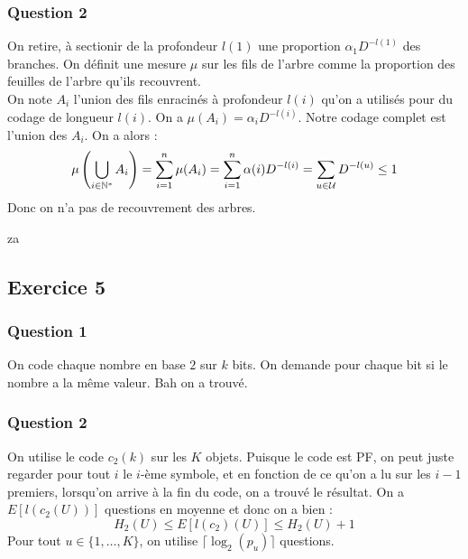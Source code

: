 \documentclass{cours}
\begin{document}
\subsubsection{Question 2}
On retire, à sectionir de la profondeur $l(1)$ une proportion $\alpha_{1}D^{-l(1)}$ des branches. On définit une mesure $\mu$ sur les fils de l'arbre comme la proportion des feuilles de l'arbre qu'ils recouvrent. \\
On note $A_{i}$ l'union des fils enracinés à profondeur $l(i)$ qu'on a utilisés pour du codage de longueur $l(i)$. On a $\mu(A_{i}) = \alpha_{i}D^{-l(i)}$. Notre codage complet est l'union des $A_{i}$. On a alors : 
\[
    \mu\left(\bigcup_{i \in \mathbb{N}^{*}} A_{i}\right) = \sum_{i = 1}^{n} \mu(A_{i}) = \sum_{i = 1}^{n}\alpha(i)D^{-l(i)} = \sum_{u \in \mathcal{U}} D^{-l(u)} \leq 1
\]
Donc on n'a pas de recouvrement des arbres. 

za
\subsection{Exercice 5}
\subsubsection{Question 1}
On code chaque nombre en base $2$ sur $k$ bits. On demande pour chaque bit si le nombre a la même valeur. Bah on a trouvé.

\subsubsection{Question 2}
On utilise le code $c_{2}(k)$ sur les $K$ objets. 
Puisque le code est PF, on peut juste regarder pour tout $i$ le $i$-ème symbole, et en fonction de ce qu'on a lu sur les $i-1$ premiers, lorsqu'on arrive à la fin du code, on a trouvé le résultat. 
On a $E[l(c_{2}(U))]$ questions en moyenne et donc on a bien : 
\[
    H_{2}(U) \leq E[l(c_{2})(U)] \leq H_{2}(U) + 1
\]
Pour tout $u \in \{1, \ldots, K\}$, on utilise $\lceil\log_{2}(p_{u})\rceil$ questions.
\end{document}
